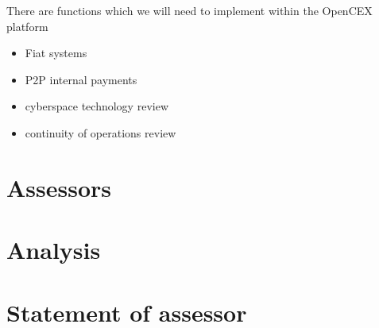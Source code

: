 \documentclass[]{report}
\begin{document}
There are functions which we will need to implement within the
OpenCEX platform
\begin{itemize}
\item Fiat systems
\item P2P internal payments
\end{itemize}


\begin{itemize}
\item cyberspace technology review
\item continuity of operations review
\end{itemize}

\section{Assessors}


\section{Analysis}

\section{Statement of assessor}

\end{document}
